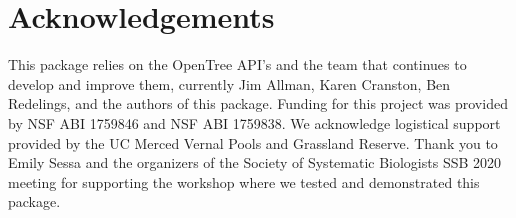 \documentclass[oupdraft]{sysbio_sse}
\begin{document}
\section{Acknowledgements}
This package relies on the OpenTree API's and the team that continues to develop and improve them, currently Jim Allman, Karen Cranston, Ben Redelings, and the authors of this package. Funding for this project was provided by NSF ABI 1759846 and NSF ABI 1759838. We acknowledge logistical support provided by the UC Merced Vernal Pools and Grassland Reserve.
Thank you to Emily Sessa and the organizers of the Society of Systematic Biologists SSB 2020 meeting for supporting the workshop where we tested and demonstrated this package. 


\bigskip\bigskip

\end{document}
